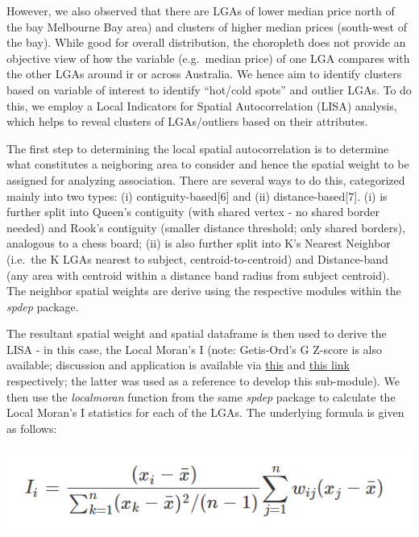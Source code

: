 \documentclass{acm_proc_article-sp}
\begin{document}
However, we also observed that there are LGAs of lower median price
north of the bay Melbourne Bay area) and clusters of higher median
prices (south-west of the bay). While good for overall distribution, the
choropleth does not provide an objective view of how the variable
(e.g.~median price) of one LGA compares with the other LGAs around ir or
across Australia. We hence aim to identify clusters based on variable of
interest to identify ``hot/cold spots'' and outlier LGAs. To do this, we
employ a Local Indicators for Spatial Autocorrelation (LISA) analysis,
which helps to reveal clusters of LGAs/outliers based on their
attributes.

The first step to determining the local spatial autocorrelation is to
determine what constitutes a neigboring area to consider and hence the
spatial weight to be assigned for analyzing association. There are
several ways to do this, categorized mainly into two types: (i)
contiguity-based{[}6{]} and (ii) distance-based{[}7{]}. (i) is further
split into Queen's contiguity (with shared vertex - no shared border
needed) and Rook's contiguity (smaller distance threshold; only shared
borders), analogous to a chess board; (ii) is also further split into
K's Nearest Neighbor (i.e.~the K LGAs nearest to subject,
centroid-to-centroid) and Distance-band (any area with centroid within a
distance band radius from subject centroid). The neighbor spatial
weights are derive using the respective modules within the \emph{spdep}
package.

The resultant spatial weight and spatial dataframe is then used to
derive the LISA - in this case, the Local Moran's I (note: Getis-Ord's G
Z-score is also available; discussion and application is available via
\href{https://onlinelibrary.wiley.com/doi/pdf/10.1111/j.1538-4632.1992.tb00261.x}{this}
and
\href{http://personal.tcu.edu/kylewalker/spatial-neighbors-in-r.html}{this
link} respectively; the latter was used as a reference to develop this
sub-module). We then use the \emph{localmoran} function from the same
\emph{spdep} package to calculate the Local Moran's I statistics for
each of the LGAs. The underlying formula is given as follows:

\includegraphics{images/lmformula.png}
\end{document}

